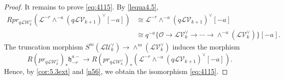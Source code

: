 \documentclass{amsart}
\numberwithin{equation}{section}
\newcommand\mc{\mathcal}
\newcommand\mf{\mathfrak}
\theoremstyle{definition}
\theoremstyle{remark}
\begin{document}
\begin{proof}
It remains to prove \cref{eq:4115}. By \cref{lequa4.5},
  \begin{align*}
    Rpr_{q\mc{L}\mc{W}_{k}^{\vee}}(\mc{L}^{-r}\wedge^{-a}(q\mc{L}\mc{V}_{k+1})^{\vee}[-a])&\cong \mc{L}^{-r}\wedge^{-a}(q\mc{L}\mc{V}_{k+1})^{\vee}[-a] \\
    &\cong q^{-a}\{\mc{O}\to \mc{L}\mc{V}_{k}^{\vee}\to \cdots \to \wedge^{-a}(\mc{L}\mc{V}_{k}^{\vee})\}[-a].
  \end{align*}
The truncation morphism $S^{m}(\mc{L}\mc{U}_{k}^{\vee})\to \wedge^{m}(\mc{L}\mc{V}_{k}^{\vee})$
  induces the morphism
  $$R(pr_{q\mc{L}\mc{W}_{k}^{\vee}})_{*}\mf{h}_{-r}^{a-}\to R(pr_{q\mc{L}\mc{W}_{k}^{\vee}})_{*}(\mc{L}^{-r}\wedge^{-a}(q\mc{L}\mc{V}_{k+1})^{\vee}[-a]).$$
Hence, by \cref{cor:5.3ext} and \cref{n56}, we obtain the isomorphism \cref{eq:4115}.
\end{proof}
\end{document}
